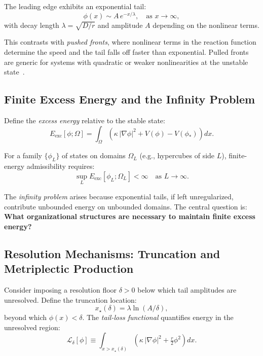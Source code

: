 \documentclass{article}
\begin{document}
The leading edge exhibits an exponential tail:
\begin{equation}
\phi(x) \sim A\, e^{-x/\lambda}, \quad \text{as } x \to \infty,
\label{eq:exponential_tail}
\end{equation}
with decay length $\lambda = \sqrt{D/r}$ and amplitude $A$ depending on the nonlinear terms.

This contrasts with \emph{pushed fronts}, where nonlinear terms in the reaction function determine the speed and the tail falls off faster than exponential. Pulled fronts are generic for systems with quadratic or weaker nonlinearities at the unstable state~\cite{vanSaarloos2003,ebert1997front}.

\subsection*{Finite Excess Energy and the Infinity Problem}

Define the \emph{excess energy} relative to the stable state:
\begin{equation}
E_{\text{exc}}[\phi; \Omega] = \int_{\Omega} \left( \kappa\,|\nabla\phi|^2 + V(\phi) - V(\phi_\ast) \right) dx.
\label{eq:excess_energy}
\end{equation}

For a family $\{\phi_L\}$ of states on domains $\Omega_L$ (e.g., hypercubes of side $L$), finite-energy admissibility requires:
\begin{equation}
\sup_L E_{\text{exc}}[\phi_L; \Omega_L] < \infty \quad \text{as } L \to \infty.
\label{eq:finite_energy_condition}
\end{equation}

The \emph{infinity problem} arises because exponential tails, if left unregularized, contribute unbounded energy on unbounded domains. The central question is: \textbf{What organizational structures are necessary to maintain finite excess energy?}

\subsection*{Resolution Mechanisms: Truncation and Metriplectic Production}

Consider imposing a resolution floor $\delta > 0$ below which tail amplitudes are unresolved. Define the truncation location:
\begin{equation}
x_\star(\delta) = \lambda \ln(A/\delta),
\label{eq:truncation_location}
\end{equation}
beyond which $\phi(x) < \delta$. The \emph{tail-loss functional} quantifies energy in the unresolved region:
\begin{equation}
\mathcal{L}_\delta[\phi] \equiv \int_{x > x_\star(\delta)} \left( \kappa\,|\nabla\phi|^2 + \tfrac{r}{2}\phi^2 \right) dx.
\label{eq:tail_loss}
\end{equation}
\end{document}
